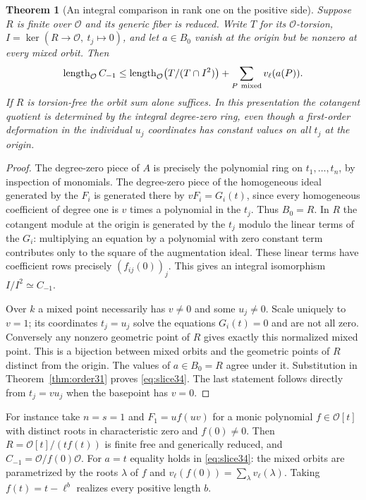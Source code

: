 \documentclass[a4paper,11pt]{article}
\newtheorem{theorem}[proposition]{Theorem}
\theoremstyle{definition}
\theoremstyle{remark}
\newcommand{\len}{\operatorname{length}}\newcommand{\Res}{\operatorname*{Res}}
\numberwithin{equation}{section}
\newcommand{\OO}{\mathcal O}
\begin{document}
\begin{theorem}[An integral comparison in rank one on the positive side]\label{thm:slice34}
Suppose \(R\) is finite over \(\OO\) and its generic fiber is reduced. Write \(T\) for its \(\OO\)-torsion, \(I=\ker(R\to\OO,\ t_j\mapsto0)\), and let \(a\in B_0\) vanish at the origin but be nonzero at every mixed orbit. Then
\begin{equation}
 \len_{\OO} C_{-1}\le
 \len_{\OO}\bigl(T/(T\cap I^2)\bigr)+
                       \sum_{P\ {\rm mixed}} v_\ell(a(P)).    \label{eq:slice34}
\end{equation}
If \(R\) is torsion-free the orbit sum alone suffices. In this presentation the cotangent quotient is determined by the integral degree-zero ring, even though a first-order deformation in the individual \(u_j\) coordinates has constant values on all \(t_j\) at the origin.
\end{theorem}
\begin{proof}
The degree-zero piece of \(A\) is precisely the polynomial ring on \(t_1,\ldots,t_n\), by inspection of monomials. The degree-zero piece of the homogeneous ideal generated by the \(F_i\) is generated there by \(vF_i=G_i(t)\), since every homogeneous coefficient of degree one is \(v\) times a polynomial in the \(t_j\). Thus \(B_0=R\). In \(R\) the cotangent module at the origin is generated by the \(t_j\) modulo the linear terms of the \(G_i\): multiplying an equation by a polynomial with zero constant term contributes only to the square of the augmentation ideal. These linear terms have coefficient rows precisely \((f_{ij}(0))_j\). This gives an integral isomorphism \(I/I^2\simeq C_{-1}\).

Over \(k\) a mixed point necessarily has \(v\ne0\) and some \(u_j\ne0\). Scale uniquely to \(v=1\); its coordinates \(t_j=u_j\) solve the equations \(G_i(t)=0\) and are not all zero. Conversely any nonzero geometric point of \(R\) gives exactly this normalized mixed point. This is a bijection between mixed orbits and the geometric points of \(R\) distinct from the origin. The values of \(a\in B_0=R\) agree under it. Substitution in Theorem~\ref{thm:order31} proves \eqref{eq:slice34}. The last statement follows directly from \(t_j=v u_j\) when the basepoint has \(v=0\).
\end{proof}

For instance take \(n=s=1\) and \(F_1=u f(uv)\) for a monic polynomial \(f\in\OO[t]\) with distinct roots in characteristic zero and \(f(0)\ne0\). Then \(R=\OO[t]/(t f(t))\) is finite free and generically reduced, and \(C_{-1}=\OO/f(0)\OO\). For \(a=t\) equality holds in \eqref{eq:slice34}: the mixed orbits are parametrized by the roots \(\lambda\) of \(f\) and \(v_\ell(f(0))=\sum_\lambda v_\ell(\lambda)\). Taking \(f(t)=t-\ell^b\) realizes every positive length \(b\).
\end{document}
